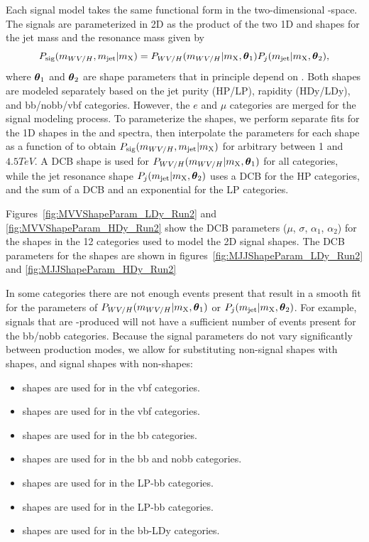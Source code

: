Each signal model takes the same functional form in the two-dimensional \MJ-\MVV space.
The signals are parameterized in 2D as the product of the two 1D \MJ and \MVV shapes for the jet mass and the resonance mass given by
\begin{equation}
  P_\mathrm{sig}(m_{WV/H},m_\mathrm{jet}|m_\mathrm{X})=P_{WV/H}(m_{WV/H}|m_\mathrm{X},\vb*{\theta}_1)P_j(m_\mathrm{jet}|m_\mathrm{X},\vb*{\theta}_2),
\end{equation}
where $\vb*{\theta}_1$ and $\vb*{\theta}_2$ are shape parameters that in principle depend on \MX.
Both shapes are modeled separately based on the jet purity (HP/LP), rapidity (HDy/LDy), and bb/nobb/vbf categories.
However, the $e$ and $\mu$ categories are merged for the signal modeling process.
To parameterize the shapes, we perform separate fits for the 1D shapes in the \MVV and \MJ spectra, then interpolate the parameters for each shape as a function of \MX to obtain $P_\mathrm{sig}(m_{WV/H},m_\mathrm{jet}|m_\mathrm{X})$ for arbitrary \MX between 1 and $4.5\unit{TeV}$.
A DCB shape is used for $P_{WV/H}(m_{WV/H}|m_\mathrm{X},\vb*{\theta}_1)$ for all categories, while the jet resonance shape $P_j(m_\mathrm{jet}|m_\mathrm{X},\vb*{\theta}_2)$ uses a DCB for the HP categories, and the sum of a DCB and an exponential for the LP categories.

Figures~\ref{fig:MVVShapeParam_LDy_Run2} and \ref{fig:MVVShapeParam_HDy_Run2} show the DCB parameters ($\mu$, $\sigma$, $\alpha_1$, $\alpha_2$) for the \MVV shapes in the 12 categories used to model the 2D signal shapes.
The DCB parameters for the \MJ shapes are shown in figures~\ref{fig:MJJShapeParam_LDy_Run2} and \ref{fig:MJJShapeParam_HDy_Run2}

In some categories there are not enough events present that result in a smooth fit for the parameters of $P_{WV/H}(m_{WV/H}|m_\mathrm{X},\vb*{\theta}_1)$ or $P_j(m_\mathrm{jet}|m_\mathrm{X},\vb*{\theta}_2)$.
For example, signals that are \VBF-produced will not have a sufficient number of events present for the bb/nobb categories.
Because the signal parameters do not vary significantly between production modes, we allow for substituting non-\VBF signal shapes with \VBF shapes, and \VBF signal shapes with non-\VBF shapes:
\begin{itemize}
  \item \VBF\ZprtoWW shapes are used for \DY\ZprtoWW in the vbf categories.
  \item \VBF\WprtoWZ shapes are used for \DY\WprtoWZ in the vbf categories.
  \item \ggF\GBulktoWW shapes are used for \VBF\GBulktoWW in the bb categories.
  \item \DY\WprtoWZ shapes are used for \VBF\WprtoWZ in the bb and nobb categories.
  \item \ggF\RadtoWW shapes are used for \VBF\RadtoWW in the LP-bb categories.
  \item \ggF\GBulktoWW \MJ shapes are used for \DY\ZprtoWW \MJ in the LP-bb categories.
  \item \DY\ZprtoWW shapes are used for \VBF\ZprtoWW in the bb-LDy categories.
\end{itemize}

